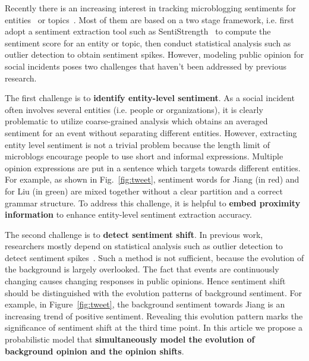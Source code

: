 \documentclass[runningheads]{llncs}
\begin{document}
Recently there is an increasing interest in tracking microblogging sentiments for entities~\cite{Giachanou2016sentichange,Giachanou2017sentichange} or topics~\cite{Tsytsarau2014Topics,Thelwall2011topic}. Most of them are based on a two stage framework, i.e. first adopt a sentiment extraction tool such as SentiStrength~\cite{sentistrength2010} to compute the sentiment score for an entity or topic, then conduct statistical analysis such as outlier detection to obtain sentiment spikes. However, modeling public opinion for social incidents poses two challenges that haven't been addressed by previous research.

The first challenge is to \textbf{identify entity-level sentiment}. 
As a social incident often involves several entities (i.e. people or organizations), it is clearly problematic to utilize coarse-grained analysis which obtains an averaged sentiment for an event without separating different entities. %
However, extracting entity level sentiment is not a trivial problem because the length limit of microblogs encourage people to use short and informal expressions.
Multiple opinion expressions are put in a sentence which targets towards different entities.
For example, as shown in Fig.~\ref{fig:tweet}, sentiment words for Jiang (in red) and for Liu (in green) are mixed together without a clear partition and a correct grammar structure. 
To address this challenge, it is helpful to \textbf{embed proximity information} to enhance entity-level sentiment extraction accuracy. 



The second challenge is to \textbf{detect sentiment shift}.
In previous work, researchers mostly depend on statistical analysis such as outlier detection to detect sentiment spikes~\cite{Giachanou2016sentichange,Giachanou2017sentichange,Giachanou2016sentitime}.
Such a method is not sufficient, because the evolution of the background is largely overlooked.
The fact that events are continuously changing causes changing responses in public opinions. Hence sentiment shift should be distinguished with the evolution patterns of background sentiment.  
For example, in Figure~\ref{fig:tweet}, the background sentiment towards Jiang is an increasing trend of positive sentiment. Revealing this evolution pattern marks the significance of sentiment shift at the third time point. %
In this article we propose a probabilistic model that \textbf{simultaneously model the evolution of background opinion and the opinion shifts}.
\end{document}
